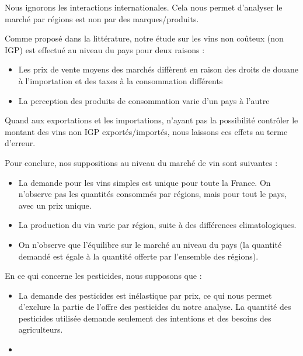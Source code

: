 \documentclass[11pt, a4paper]{article}
\begin{document}
Nous ignorons les interactions internationales. 
Cela nous permet d'analyser le marché par régions est non par des marques/produits.
\par
Comme proposé dans la littérature, notre étude sur les vins non coûteux (non IGP) est effectué au niveau du pays \cite{cembalo2014} pour deux raisons :
\begin{itemize}
    \item Les prix de vente moyens des marchés diffèrent en raison des droits de douane à l'importation et des taxes à la consommation différents %
    \item La perception des produits de consommation varie d'un pays à l'autre %
\end{itemize}
Quand aux exportations et les importations, n'ayant pas la possibilité contrôler le montant des vins non IGP exportés/importés, nous laissons ces effets au terme d'erreur. 
\par
Pour conclure, nos suppositions au niveau du marché de vin sont suivantes :
\begin{itemize}
    \item La demande pour les vins simples est unique pour toute la France. On n'observe pas les quantités consommés par régions, mais pour tout le pays, avec un prix unique. 
    \item La production du vin varie par région, suite à des différences climatologiques.
    \item On n'observe que l'équilibre sur le marché au niveau du pays (la quantité demandé est égale à la quantité offerte par l'ensemble des régions).
\end{itemize}
\par
En ce qui concerne les pesticides, nous supposons que :
\begin{itemize}
    \item La demande des pesticides est inélastique par prix, ce qui nous permet d'exclure la partie de l'offre des pesticides du notre analyse. La quantité des pesticides utilisée demande seulement des intentions et des besoins des agriculteurs. 
    \item 
\end{itemize}
\par
\end{document}

